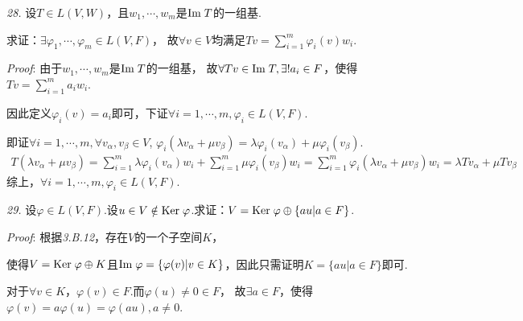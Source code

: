 \hspace*{\fill}

    \begin{comment}
        \textit{26.}
        设$D \in L(P(R))$对于其中任意的多项式$p$满足$\mydeg Dp=\mydeg p-1$.

        求证：$D$是满射变换.

        \textit{Proof}:
        根据\textit{3.B.10}，命题等价于
            \begin{align*}
                \myspan (D(x),D(x^2),\cdots)=\Img D=P(R)=\myspan (1,x,\cdots)
            \end{align*}
        根据\textit{2.C.10}，由于$\mydeg Dp=\mydeg p-1$，

        故$\myspan (D(x),D(x^2),\cdots)=\myspan (1,x,\cdots)$成立.
    \end{comment}

\textit{28.}
设$T \in L(V,W)$，且$w_1,\cdots,w_m$是$\mathrm{Im \;} T$的一组基.

求证：$\exists \varphi_1,\cdots,\varphi_m \in L(V,F)$，
故$\forall v \in V$均满足$Tv=\sum_{i=1}^m{\varphi_i(v)w_i}$.

\textit{Proof}:
由于$w_1,\cdots,w_m$是$\mathrm{Im \;} T$的一组基，
故$\forall Tv \in \mathrm{Im \;} T,\exists! a_i \in F$，使得$Tv=\sum_{i=1}^m a_iw_i$.

因此定义$\varphi_i(v)=a_i$即可，下证$\forall i=1,\cdots,m,\varphi_i \in L(V,F)$.

即证$\forall i=1,\cdots,m,\forall v_\alpha,v_\beta \in V$,
$\varphi_i(\lambda v_\alpha+\mu v_\beta)=\lambda \varphi_i(v_\alpha)+\mu \varphi_i(v_\beta)$.
    \begin{align*}
        T(\lambda v_\alpha+\mu v_\beta)=\sum_{i=1}^m \lambda \varphi_i(v_\alpha)w_i+\sum_{i=1}^m \mu \varphi_i(v_\beta)w_i
        =\sum_{i=1}^m \varphi_i(\lambda v_\alpha+\mu v_\beta)w_i=\lambda Tv_\alpha+\mu Tv_\beta
    \end{align*}
综上，$\forall i=1,\cdots,m,\varphi_i \in L(V,F)$.

\hspace*{\fill}

\textit{29.}
设$\varphi \in L(V,F)$.设$u \in V \notin \mathrm{Ker \;} \varphi$.求证：$V=\mathrm{Ker \;} \varphi \oplus \{au|a \in F\}$.

\textit{Proof}:
根据\textit{3.B.12}，存在$V$的一个子空间$K$，

使得$V=\mathrm{Ker \;} \varphi \oplus K$且$\mathrm{Im \;} \varphi=\{\varphi (v)|v \in K\}$，因此只需证明$K=\{au|a \in F\}$即可.

对于$\forall v \in K$，$\varphi(v) \in F$.而$\varphi(u) \ne 0 \in F$，
故$\exists a \in F$，使得$\varphi(v)=a \varphi(u)=\varphi(au),a \ne 0$.

